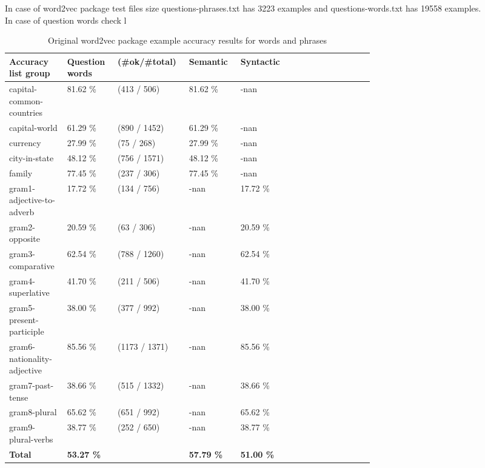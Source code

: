 \documentclass[letterpaper]{article}
\begin{document}
      In case of word2vec package test files size questions-phrases.txt has 3223 examples and questions-words.txt has 19558 examples.\\
      In case of question words check l



	\begin{table}[ht]
	\centering
	\begin{tabular}{|p{0.1\linewidth}|p{0.1\linewidth}|p{0.1\linewidth}|p{0.1\linewidth}|p{0.1\linewidth}|p{0.1\linewidth}|p{0.1\linewidth}|}
		\hline
		\textbf{Accuracy list group}& \textbf{Question words}  & \textbf{(\#ok/\#total)}& \textbf{Semantic} & \textbf{Syntactic}\\
		\hline
		\hline
		capital-common-countries& 81.62 \% & (413 / 506) & 81.62 \% & -nan\\
		\hline
		capital-world& 61.29 \% & (890 / 1452) & 61.29 \% & -nan\\
		\hline
		currency& 27.99 \% & (75 / 268) & 27.99 \% & -nan\\
		\hline
		city-in-state& 48.12 \% & (756 / 1571)& 48.12 \% & -nan\\
		\hline
		family&77.45 \% & (237 / 306)& 77.45 \% &  -nan \\
		\hline
		gram1-adjective-to-adverb& 17.72 \% &  (134 / 756)& -nan & 17.72 \% \\
		\hline
	    gram2-opposite& 20.59 \% & (63 / 306)& -nan & 20.59 \% \\
		\hline
		gram3-comparative&62.54 \% & (788 / 1260)& -nan & 62.54 \% \\
		\hline
		gram4-superlative&41.70 \% &  (211 / 506)& -nan & 41.70 \% \\
		\hline
		gram5-present-participle& 38.00 \% & (377 / 992)& -nan &  38.00 \% \\
		\hline
		gram6-nationality-adjective&85.56 \% &  (1173 / 1371)& -nan & 85.56 \% \\
		\hline
		gram7-past-tense& 38.66 \% & (515 / 1332) & -nan & 38.66 \% \\
		\hline
		gram8-plural& 65.62 \% & (651 / 992) & -nan & 65.62 \% \\
		\hline
		gram9-plural-verbs&38.77 \% & (252 / 650)& -nan & 38.77 \% \\
		\hline
		\hline
		\textbf{Total}& \textbf{53.27 \% }&  & \textbf{57.79 \% }&  \textbf{51.00 \% }\\
		\hline
		
	\end{tabular}
	\caption{Original word2vec package example accuracy results for words and phrases}
	\label{tab:original-accuracy-results}
\end{table}	
\end{document}
